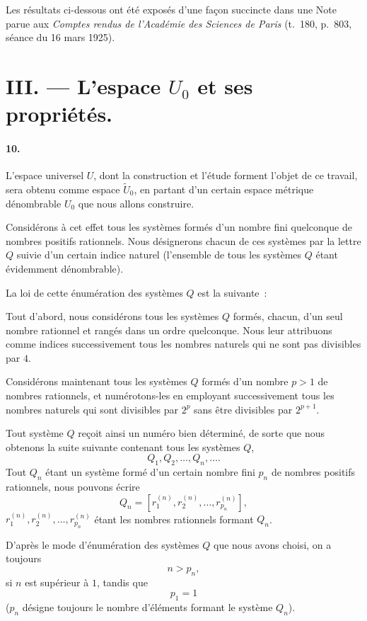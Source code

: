 \documentclass[a4paper,12pt]{amsart}
\newcommand{\srcpage}[1]{} %
\begin{document}
Les résultats ci-dessous ont été exposés d'une façon succincte dans une Note parue aux \textit{Comptes rendus de l'Académie des Sciences de Paris} (t.~180, p.~803, séance du 16 mars 1925).

\section*{III. --- L'espace $U_0$ et ses propriétés.}
\paragraph{10.}
L'espace universel $U$, dont la construction et l'étude forment l'objet de ce travail, sera obtenu comme espace $\widetilde{U}_0$, en partant d'un certain espace métrique dénombrable $U_0$ que nous allons construire.

Considérons à cet effet tous les systèmes formés d'un nombre fini quelconque de nombres positifs rationnels. Nous désignerons chacun de ces systèmes par la lettre $Q$ suivie d'un certain indice naturel (l'ensemble de tous les systèmes $Q$ étant évidemment dénombrable).

La loi de cette énumération des systèmes $Q$ est la suivante~:

Tout d'abord, nous considérons tous les systèmes $Q$ formés, chacun, d'un seul nombre rationnel et rangés dans un ordre quelconque. Nous leur attribuons comme indices successivement tous les nombres naturels qui ne sont pas divisibles par $4$.
\srcpage{53}

Considérons maintenant tous les systèmes $Q$ formés d'un nombre $p>1$ de nombres rationnels, et numérotons-les en employant successivement tous les nombres naturels qui sont divisibles par $2^p$ sans être divisibles par $2^{p+1}$.

Tout système $Q$ reçoit ainsi un numéro bien déterminé, de sorte que nous obtenons la suite suivante contenant tous les systèmes $Q$,
\begin{equation}\tag{3}
Q_1,Q_2,\dots,Q_n,\dots.
\end{equation}
Tout $Q_n$ étant un système formé d'un certain nombre fini $p_n$ de nombres positifs rationnels, nous pouvons écrire
\begin{equation}\tag{4}
Q_n=[r_1^{(n)},r_2^{(n)},\dots,r_{p_n}^{(n)}],
\end{equation}
$r_1^{(n)},r_2^{(n)},\dots,r_{p_n}^{(n)}$ étant les nombres rationnels formant $Q_n$.

D'après le mode d'énumération des systèmes $Q$ que nous avons choisi, on a toujours
\begin{equation}\tag{5}
n>p_n,
\end{equation}
si $n$ est supérieur à $1$, tandis que
\begin{equation}\tag{$5_1$}
p_1=1
\end{equation}
($p_n$ désigne toujours le nombre d'éléments formant le système $Q_n$).
\end{document}
